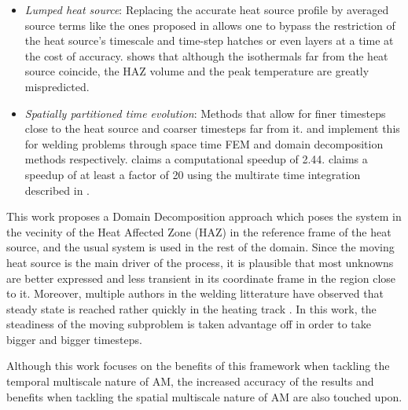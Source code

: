 \begin{itemize}
  \item \textit{Lumped heat source}: Replacing the accurate
    heat source profile by averaged source terms
    like the ones proposed in \citep{Chiumenti2017, Malmelv2019}
    allows one to bypass the restriction of
    the heat source's timescale and time-step hatches
    or even layers at a time at the cost of accuracy.
    \citep{VanElsen2007} shows that although the
    isothermals far from the heat source coincide,
    the HAZ volume and the peak temperature are
    greatly mispredicted.
  \item \textit{Spatially partitioned time evolution}: Methods
    that allow for finer timesteps close to the heat source
    and coarser timesteps far from it. \citep{Kopp2022} and
    \citep{Viguerie2022} implement this for welding problems
    through space time FEM and domain decomposition methods respectively.
    \citep{Viguerie2022} claims a computational speedup of 2.44.
    \citep{Puso2023} claims a speedup of at least a factor of 20
    using the multirate time integration described in \citep{Hodge2021}.
\end{itemize}

This work proposes a Domain Decomposition approach which poses the
system in the vecinity of the Heat Affected Zone (HAZ) in the
reference frame of the heat source, and the usual system is used
in the rest of the domain. Since the moving heat source is the main driver
of the process, it is plausible that most unknowns are
better expressed and less transient in its coordinate frame in the region close to it.
Moreover, multiple authors in the welding litterature
have observed that steady state is reached rather quickly in the heating track
\citep{Mundra1996, VanElsen2007, Powar2016}. In this work,
the steadiness of the moving subproblem is taken advantage off 
in order to take bigger and bigger timesteps.\par

Although this work focuses on the benefits of this framework
when tackling the temporal multiscale nature of AM,
the increased accuracy of the results and benefits
when tackling the spatial multiscale nature of AM \citep{Storti2022, carraturo2021twolevel}
are also touched upon.\par
